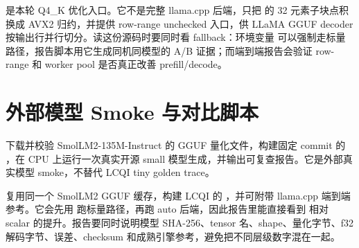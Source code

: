 

 是本轮 Q4\_K 优化入口。它不是完整 llama.cpp 后端，只把  的 32 元素子块点积换成 AVX2  归约，并提供 row-range unchecked 入口，供 LLaMA GGUF decoder 按输出行并行切分。读这份源码时要同时看 fallback：环境变量  可以强制走标量路径，报告脚本用它生成同机同模型的 A/B 证据；而端到端报告会验证 row-range 和 worker pool 是否真正改善 prefill/decode。



\section{外部模型 Smoke 与对比脚本}

 下载并校验 SmolLM2-135M-Instruct 的 GGUF 量化文件，构建固定 commit 的 ，在 CPU 上运行一次真实开源 small 模型生成，并输出可复查报告。它是外部真实模型 smoke，不替代 LCQI tiny golden trace。



 复用同一个 SmolLM2 GGUF 缓存，构建 LCQI 的 ，并可附带 llama.cpp  端到端参考。它会先用  跑标量路径，再跑 auto 后端，因此报告里能直接看到  相对 scalar 的提升。报告要同时说明模型 SHA-256、tensor 名、shape、量化字节、f32 解码字节、误差、checksum 和成熟引擎参考，避免把不同层级数字混在一起。




